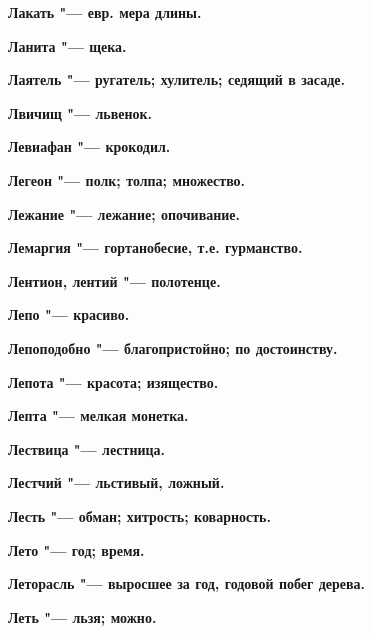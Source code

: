 \bfseries Лакать \normalfont{} "--- евр. мера длины. 




\bfseries Ланита \normalfont{} "--- щека. 




\bfseries Лаятель \normalfont{} "--- ругатель; хулитель; седящий в засаде. 




\bfseries Лвичищ \normalfont{} "--- львенок. 




\bfseries Левиафан \normalfont{} "--- крокодил. 




\bfseries Легеон \normalfont{} "--- полк; толпа; множество. 




\bfseries Лежание \normalfont{} "--- лежание; опочивание. 




\bfseries Лемаргия \normalfont{} "--- гортанобесие, т.е. гурманство. 




\bfseries Лентион, лентий \normalfont{} "--- полотенце. 




\bfseries Лепо \normalfont{} "--- красиво. 




\bfseries Лепоподобно \normalfont{} "--- благопристойно; по достоинству. 




\bfseries Лепота \normalfont{} "--- красота; изящество. 




\bfseries Лепта \normalfont{} "--- мелкая монетка. 




\bfseries Лествица \normalfont{} "--- лестница. 




\bfseries Лестчий \normalfont{} "--- льстивый, ложный. 




\bfseries Лесть \normalfont{} "--- обман; хитрость; коварность. 




\bfseries Лето \normalfont{} "--- год; время. 




\bfseries Леторасль \normalfont{} "--- выросшее за год, годовой побег дерева. 




\bfseries Леть \normalfont{} "--- льзя; можно. 




